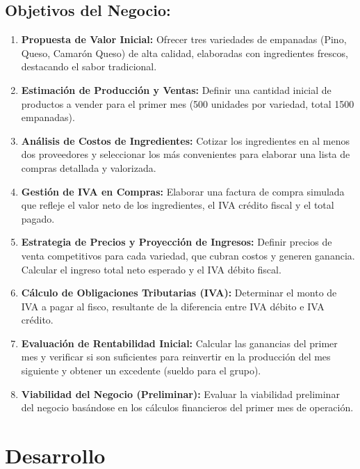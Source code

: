 \documentclass[12pt]{article}
\begin{document}
\subsection{Objetivos del Negocio:}
\begin{enumerate}
    \item \textbf{Propuesta de Valor Inicial:} Ofrecer tres variedades de empanadas (Pino, Queso, Camarón Queso) de alta calidad, elaboradas con ingredientes frescos, destacando el sabor tradicional.
    \item \textbf{Estimación de Producción y Ventas:} Definir una cantidad inicial de productos a vender para el primer mes (500 unidades por variedad, total 1500 empanadas).
    \item \textbf{Análisis de Costos de Ingredientes:} Cotizar los ingredientes en al menos dos proveedores y seleccionar los más convenientes para elaborar una lista de compras detallada y valorizada.
    \item \textbf{Gestión de IVA en Compras:} Elaborar una factura de compra simulada que refleje el valor neto de los ingredientes, el IVA crédito fiscal y el total pagado.
    \item \textbf{Estrategia de Precios y Proyección de Ingresos:} Definir precios de venta competitivos para cada variedad, que cubran costos y generen ganancia. Calcular el ingreso total neto esperado y el IVA débito fiscal.
    \item \textbf{Cálculo de Obligaciones Tributarias (IVA):} Determinar el monto de IVA a pagar al fisco, resultante de la diferencia entre IVA débito e IVA crédito.
    \item \textbf{Evaluación de Rentabilidad Inicial:} Calcular las ganancias del primer mes y verificar si son suficientes para reinvertir en la producción del mes siguiente y obtener un excedente (sueldo para el grupo).
    \item \textbf{Viabilidad del Negocio (Preliminar):} Evaluar la viabilidad preliminar del negocio basándose en los cálculos financieros del primer mes de operación.

\end{enumerate}

\newpage



\section{Desarrollo} %
\end{document}
